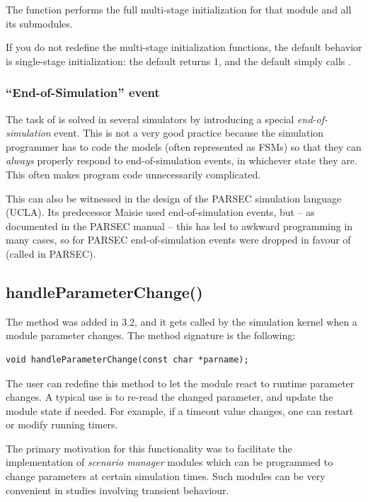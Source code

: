 The  function performs the full multi-stage initialization
for that module and all its submodules.

If you do not redefine the multi-stage initialization functions, the
default behavior is single-stage initialization: the default
 returns 1, and the default 
simply calls .


\subsubsection{``End-of-Simulation'' event}


The task of  is solved in several simulators
by introducing a special \textit{end-of-simulation} event.
This is not a very good practice because the simulation programmer has to
code the models (often represented as FSMs) so that they can \textit{always}
properly respond to end-of-simulation events, in whichever state they are. This
often makes program code unnecessarily complicated.

This can also be witnessed in the design of the PARSEC
simulation language (UCLA). Its predecessor Maisie used
end-of-simulation events, but -- as documented in the PARSEC manual --
this has led to awkward programming in many cases, so for PARSEC
end-of-simulation events were dropped in favour of 
(called  in PARSEC).


\subsection{handleParameterChange()}
\label{sec:handleParameterChange}

The  method was added in {\opp} 3.2,
and it gets called by the simulation kernel when a module parameter changes.
The method signature is the following:

\begin{verbatim}
void handleParameterChange(const char *parname);
\end{verbatim}

The user can redefine this method to let the module react to runtime parameter
changes. A typical use is to re-read the changed parameter, and update
the module state if needed. For example, if a timeout value changes,
one can restart or modify running timers.

The primary motivation for this functionality was to facilitate
the implementation of \textit{scenario manager} modules which
can be programmed to change parameters at certain simulation times.
Such modules can be very convenient in studies involving transient behaviour.

